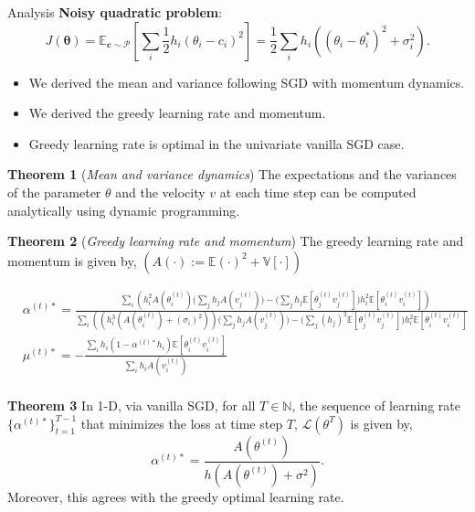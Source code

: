 \documentclass[final,t]{beamer}
\begin{document}
\begin{frame}{}
\begin{columns}[t]
\begin{column}{.32\linewidth}
    \begin{exampleblock}{Analysis}
    \textbf{Noisy quadratic problem}:
    \begin{equation*}
    J(\boldsymbol{\theta}) = \mathbb{E}_{\mathbf{c}\sim\mathcal{P}}\left[\sum_i \frac{1}{2}h_{i}(\theta_{i}-c_{i})^2\right] = \frac{1}{2}\sum_ih_{i}((\theta_{i}-\theta_i^*)^2+\sigma_{i}^2).
    \end{equation*}
    \vskip -0.5cm
	\begin{itemize}
        \item We derived the mean and variance following SGD with momentum dynamics. 
        \item We derived the greedy learning rate and momentum.
        \item Greedy learning rate is optimal in the univariate vanilla SGD case.
    \end{itemize}
    
    \vspace{0.6in}
\textbf{Theorem 1} (\emph{Mean and variance dynamics})
    The expectations and the variances of the parameter $\theta$ and the velocity $v$ at each time step can be computed analytically using dynamic programming.
    
    \vspace{0.6in}
    \textbf{Theorem 2} (\emph{Greedy learning rate and momentum}) The greedy learning rate and momentum is given by, $(A(\cdot) := \mathbb{E}(\cdot)^2+\mathbb{V}[\cdot])$
    \begin{footnotesize}
  \begin{align*}
  &\alpha^{(t)*} =\frac{\sum_i \left(h_{i}^2A(\theta^{(t)}_{i})\Big(\sum_j h_{j}A(v^{(t)}_{j})\Big)-\Big(\sum_jh_{j}\mathbb{E}[\theta^{(t)}_{j}v^{(t)}_{j}]\Big) h_{i}^2\mathbb{E}[\theta^{(t)}_{i}v^{(t)}_{i}]\right)}{\sum_i\left( \left(h_{i}^3(A(\theta^{(t)}_{i})+(\sigma_{i})^2)\right)\Big(\sum_j h_{j}A(v^{(t)}_{j})\Big)-\Big(\sum_j(h_{j})^2\mathbb{E}[\theta^{(t)}_{j}v^{(t)}_{j}]\Big) h_{i}^2\mathbb{E}[\theta^{(t)}_{i}v^{(t)}_{i}]\right)}\\
  &\mu^{(t)*} = -\frac{\sum_i h_{i}(1-\alpha^{(t)*}  h_{i})\mathbb{E}[\theta^{(t)}_{i}v^{(t)}_{i}]}{\sum_i h_{i}A(v^{(t)}_{i})}\\
  \end{align*}
    \end{footnotesize}
    \hspace{-0.5cm}\textbf{Theorem 3} In 1-D, via vanilla SGD, for all $T\in\mathbb{N}$, the sequence of learning rate $\{\alpha^{(t)*}\}_{t=1}^{T-1}$ that minimizes the loss at time step $T$, $\mathcal{L}(\theta^T)$ is given by,
    \begin{equation*}
        \alpha^{(t)*} = \frac{A(\theta^{(t)})}{h(A(\theta^{(t)})+\sigma^2)}.
    \end{equation*}
    Moreover, this agrees with the greedy optimal learning rate.
    

\end{exampleblock}
\end{column}
\end{columns}
\end{frame}
\end{document}
